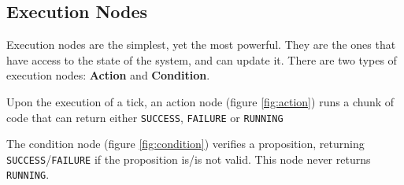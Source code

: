 \documentclass[a4paper,UKenglish,cleveref, autoref, thm-restate]{oasics-v2019}
\begin{document}
\subsection{Execution Nodes}
Execution nodes are the simplest, yet the most powerful. They are the ones that have access to the state of the system, and can update it.
There are two types of execution nodes: \textbf{Action} and \textbf{Condition}.


Upon the execution of a tick, an action node (figure \ref{fig:action}) runs a chunk of code that can return either \texttt{SUCCESS}, \texttt{FAILURE} or \texttt{RUNNING}


The condition node (figure \ref{fig:condition}) verifies a proposition, returning \texttt{SUCCESS}/\texttt{FAILURE} if the proposition is/is not valid.
This node never returns \texttt{RUNNING}.
\end{document}
